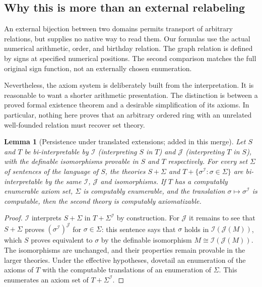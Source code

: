 \documentclass[11pt,letterpaper]{article}
\newtheorem{lemma}[lemma]{Lemma}\aliascntresetthe{lemma}
\theoremstyle{definition}
\theoremstyle{remark}
\newcommand{\I}{\mathcal I}
\newcommand{\J}{\mathcal J}
\begin{document}
\subsection{Why this is more than an external relabeling}

An external bijection between two domains permits transport of arbitrary
relations, but supplies no native way to read them. Our formulas use the actual
numerical arithmetic, order, and birthday relation. The graph relation is defined
by signs at specified numerical positions. The second comparison matches the full
original sign function, not an externally chosen enumeration.

Nevertheless, the axiom system is deliberately built from the interpretation. It
is reasonable to want a shorter arithmetic presentation. The distinction is
between a proved formal existence theorem and a desirable simplification of its
axioms. In particular, nothing here proves that an arbitrary ordered ring with an
unrelated well-founded relation must recover set theory.

\begin{lemma}[Persistence under translated extensions; added in this merge]
\label{hset:sf:lem:persist}
Let $S$ and $T$ be bi-interpretable by $\I$ (interpreting $S$ in $T$) and $\J$
(interpreting $T$ in $S$), with the definable isomorphisms provable in $S$ and $T$
respectively. For every set $\Sigma$ of sentences of the language of $S$, the
theories $S+\Sigma$ and $T+\{\sigma^\I:\sigma\in\Sigma\}$ are bi-interpretable by
the same $\I$, $\J$ and isomorphisms. If $T$ has a computably enumerable
axiom set, $\Sigma$ is computably enumerable, and the translation
$\sigma\mapsto\sigma^\I$ is computable, then the second theory is computably
axiomatizable.
\end{lemma}
\begin{proof}
$\I$ interprets $S+\Sigma$ in $T+\Sigma^\I$ by construction. For $\J$ it remains to
see that $S+\Sigma$ proves $(\sigma^\I)^\J$ for $\sigma\in\Sigma$: this sentence
says that $\sigma$ holds in $\I(\J(M))$, which $S$ proves equivalent to $\sigma$ by
the definable isomorphism $M\cong\I(\J(M))$. The isomorphisms are unchanged, and
their properties remain provable in the larger theories. Under the effective
hypotheses, dovetail an enumeration of the axioms of $T$ with the computable
translations of an enumeration of $\Sigma$. This enumerates an axiom set of
$T+\Sigma^\I$.
\end{proof}
\end{document}
